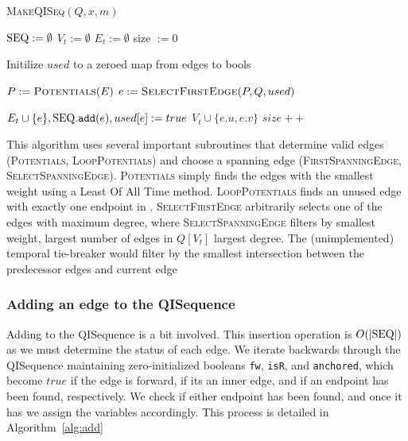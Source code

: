 \begin{algorithm}
  \label{alg:qi_seq}
  \caption{\textsc{MakeQISeq}$(Q,x,m)$}
  \SetAlgoLined


  ${\text{SEQ}} := \emptyset$\;
  $V_t := \emptyset$\;
  $E_t := \emptyset$\;
  size $:= 0$\;

  Initilize $used$ to a zeroed map from edges to bools\;

  $P := \textsc{Potentials}(E)$ \;
  $e := \textsc{SelectFirstEdge}(P, Q, used)$\;

  $E_t \cup \{e\}, {\text{SEQ}}.\texttt{add}(e), used[e] := true$\;
  $V_t \cup \{e.u,e.v\}$\;
  $size++$\;

  \Return \seq\;

\end{algorithm}

This algorithm uses several important subroutines that determine valid edges
(\textsc{Potentials}, \textsc{LoopPotentials}) and choose a spanning edge
(\textsc{FirstSpanningEdge}, \textsc{SelectSpanningEdge}). \textsc{Potentials}
simply finds the edges with the smallest weight using a Least Of All Time
method.  \textsc{LoopPotentials} finds an unused edge with exactly one endpoint
in \seq.  \textsc{SelectFirstEdge} arbitrarily selects one of the edges with
maximum degree, where \textsc{SelectSpanningEdge} filters by smallest weight,
largest number of edges in $Q[V_t]$ largest degree.  The (unimplemented)
temporal tie-breaker would filter by the smallest intersection between the
predecessor edges and current edge 

\subsubsection{Adding an edge to the QISequence}
Adding to the QISequence is a bit involved. This insertion operation is
$O(|{\text{SEQ}}|)$ as we must determine the status of each edge.  We iterate backwards
through the QISequence maintaining zero-initialized booleans \texttt{fw},
\texttt{isR}, and \texttt{anchored}, which become $true$ if the edge is forward,
if its an inner edge, and if an endpoint has been found, respectively. We check
if either endpoint has been found, and once it has we assign the variables
accordingly. This process is detailed in Algorithm~\ref{alg:add}

